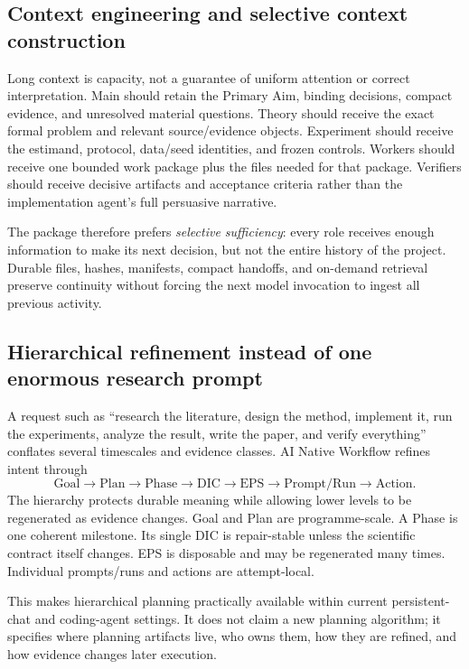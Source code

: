 \documentclass[11pt,a4paper]{article}
\begin{document}
\subsection{Context engineering and selective context construction}\label{sec:context-rationale}
Long context is capacity, not a guarantee of uniform attention or correct interpretation. Main should retain the Primary Aim, binding decisions, compact evidence, and unresolved material questions. Theory should receive the exact formal problem and relevant source/evidence objects. Experiment should receive the estimand, protocol, data/seed identities, and frozen controls. Workers should receive one bounded work package plus the files needed for that package. Verifiers should receive decisive artifacts and acceptance criteria rather than the implementation agent's full persuasive narrative.

The package therefore prefers \emph{selective sufficiency}: every role receives enough information to make its next decision, but not the entire history of the project. Durable files, hashes, manifests, compact handoffs, and on-demand retrieval preserve continuity without forcing the next model invocation to ingest all previous activity.

\subsection{Hierarchical refinement instead of one enormous research prompt}\label{sec:hierarchy-rationale}
A request such as ``research the literature, design the method, implement it, run the experiments, analyze the result, write the paper, and verify everything'' conflates several timescales and evidence classes. AI Native Workflow refines intent through
\[
\text{Goal}\to\text{Plan}\to\text{Phase}\to\text{DIC}\to\text{EPS}\to\text{Prompt/Run}\to\text{Action}.
\]
The hierarchy protects durable meaning while allowing lower levels to be regenerated as evidence changes. Goal and Plan are programme-scale. A Phase is one coherent milestone. Its single DIC is repair-stable unless the scientific contract itself changes. EPS is disposable and may be regenerated many times. Individual prompts/runs and actions are attempt-local.

This makes hierarchical planning practically available within current persistent-chat and coding-agent settings. It does not claim a new planning algorithm; it specifies where planning artifacts live, who owns them, how they are refined, and how evidence changes later execution.
\end{document}
